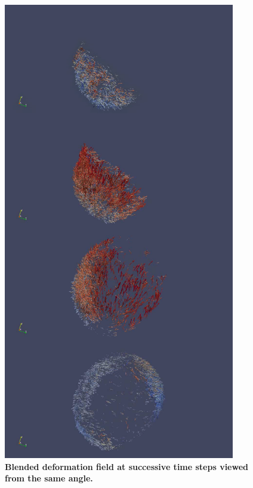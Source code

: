 \begin{figure}
\begin{center}
\includegraphics[width=0.9\textwidth]{../../images/Reconstruction/washington/blendingfunction_deffield_multits.png}
\end{center}
\caption{\textbf{Blended deformation field at successive time steps viewed from the same angle.}}
\label{washington_blendingfunction_deffield_multits}
\end{figure}
